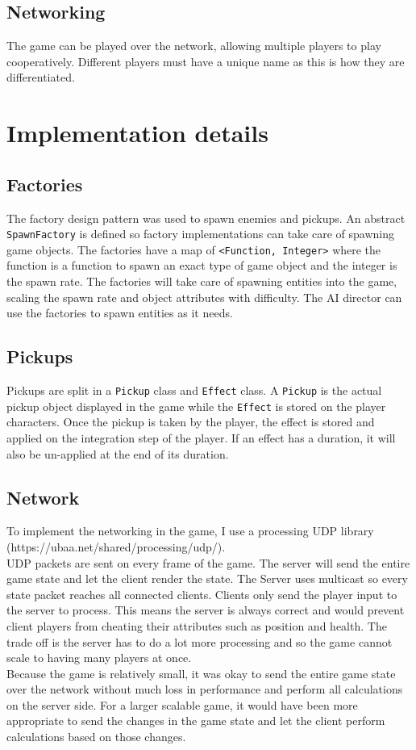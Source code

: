 \documentclass{article}
\newcommand{\n}[0]{\\[\baselineskip]}
\begin{document}
\subsection{Networking}
The game can be played over the network, allowing multiple players to play cooperatively. Different players must have a unique name as this is how they are differentiated. 

\section{Implementation details}
\subsection{Factories}
The factory design pattern was used to spawn enemies and pickups. An abstract \texttt{SpawnFactory} is defined so factory implementations can take care of spawning game objects. The factories have a map of \texttt{<Function, Integer>} where the function is a function to spawn an exact type of game object and the integer is the spawn rate. The factories will take care of spawning entities into the game, scaling the spawn rate and object attributes with difficulty. The AI director can use the factories to spawn entities as it needs.
\subsection{Pickups}
Pickups are split in a \texttt{Pickup} class and \texttt{Effect} class. A \texttt{Pickup} is the actual pickup object displayed in the game while the \texttt{Effect} is stored on the player characters. Once the pickup is taken by the player, the effect is stored and applied on the integration step of the player. If an effect has a duration, it will also be un-applied at the end of its duration. 

\subsection{Network}
To implement the networking in the game, I use a processing UDP library (https://ubaa.net/shared/processing/udp/).
\n
UDP packets are sent on every frame of the game. The server will send the entire game state and let the client render the state. The Server uses multicast so every state packet reaches all connected clients. Clients only send the player input to the server to process. This means the server is always correct and would prevent client players from cheating their attributes such as position and health. The trade off is the server has to do a lot more processing and so the game cannot scale to having many players at once.
\n
Because the game is relatively small, it was okay to send the entire game state over the network without much loss in performance and perform all calculations on the server side. For a larger scalable game, it would have been more appropriate to send the changes in the game state and let the client perform calculations based on those changes.
\end{document}
